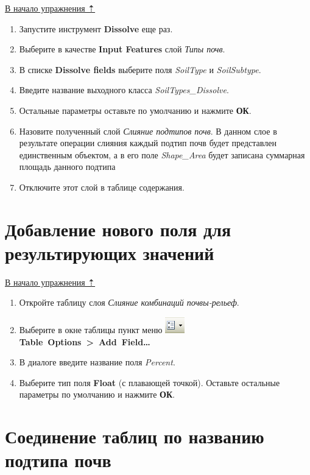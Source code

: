 \documentclass[]{book}
\theoremstyle{definition}
\theoremstyle{definition}
\theoremstyle{definition}
\theoremstyle{remark}
\begin{document}
\protect\hyperlink{overlay}{В начало упражнения ⇡}

\begin{enumerate}
\def\labelenumi{\arabic{enumi}.}
\item
  Запустите инструмент \textbf{Dissolve} еще раз.
\item
  Выберите в качестве \textbf{Input Features} слой \emph{Типы почв}.
\item
  В списке \textbf{Dissolve fields} выберите поля \emph{SoilType} и
  \emph{SoilSubtype}.
\item
  Введите название выходного класса \emph{SoilTypes\_Dissolve}.
\item
  Остальные параметры оставьте по умолчанию и нажмите \textbf{ОК}.
\item
  Назовите полученный слой \emph{Слияние подтипов почв}. В данном слое в
  результате операции слияния каждый подтип почв будет представлен
  единственным объектом, а в его поле \emph{Shape\_Area} будет записана
  суммарная площадь данного подтипа
\item
  Отключите этот слой в таблице содержания.
\end{enumerate}

\hypertarget{overlay-field}{%
\section{Добавление нового поля для результирующих
значений}\label{overlay-field}}

\protect\hyperlink{overlay}{В начало упражнения ⇡}

\begin{enumerate}
\def\labelenumi{\arabic{enumi}.}
\item
  Откройте таблицу слоя \emph{Слияние комбинаций почвы-рельеф}.
\item
  Выберите в окне таблицы пункт меню
  \includegraphics{images/Ex10/image11.png}
  \textbf{Table~Options~\textgreater{}~Add~Field\ldots{}}
\item
  В диалоге введите название поля \emph{Percent}.
\item
  Выберите тип поля \textbf{Float} (с плавающей точкой). Оставьте
  остальные параметры по умолчанию и нажмите \textbf{ОК}.
\end{enumerate}

\hypertarget{overlay-join}{%
\section{Соединение таблиц по названию подтипа
почв}\label{overlay-join}}
\end{document}
